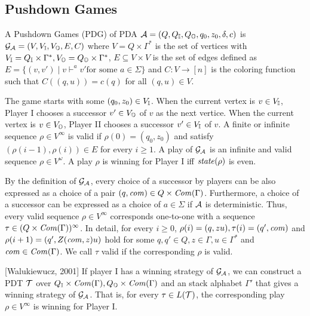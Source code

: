 \subsection{Pushdown Games}

\begin{definition}
A {Pushdown Games} (PDG) of PDA ${\cal A} = (Q, Q_{\mathbb{I}}, Q_{\mathbb{O}}, q_0, z_0, \delta, c)$ is ${\cal G}_{\cal A} = (V, V_{\mathbb{I}}, V_{\mathbb{O}}, E, C)$ where
$V = Q\times\Gamma^*$ is the set of vertices with $V_{\mathbb{I}} = Q_{\mathbb{I}}\times\Gamma^*, V_{\mathbb{O}} = Q_{\mathbb{O}}\times\Gamma^*$, $E\subseteq V\times V$ is the set of edges defined as $E = \{(v,v') \mid v \vdash^a v' \text{for some $a\in \Sigma$}\}$
and $C: V \to [n]$ is the coloring function such that
$C((q,u)) = c(q)$ for all $(q,u)\in V$.
\end{definition}

The game starts with some $(q_0,z_0)\in V_{\mathbb{I}}$.
When the current vertex is $v\in V_{\mathbb{I}}$,
Player I chooses a successor $v'\in V_{\mathbb{O}}$ of $v$ as the next vertice.
When the current vertex is $v\in V_{\mathbb{O}}$,
Player II chooses a successor $v'\in V_{\mathbb{I}}$ of $v$.
A finite or infinite sequence $\rho\in V^\infty$ is valid if
$\rho(0)=(q_0,z_0)$ and satisfy
$(\rho(i-1), \rho(i))\in E$ for every $i\geq 1$.
A play of ${\cal G}_{\cal A}$ is an infinite and valid sequence $\rho\in V^\omega$.
A play $\rho$ is winning for Player I iff $\mathit{state}(\rho)$ is even.

By the definition of ${\cal G}_{\cal A}$,
every choice of a successor by players can be also expressed as
a choice of a pair $(q,\mathit{com})\in Q\times \mathit{Com}(\Gamma)$. Furthermore, a choice of a successor can be expressed as a choice of $a\in\Sigma$ if ${\cal A}$ is deterministic.
Thus, every valid sequence $\rho \in V^\infty$
corresponds one-to-one with a sequence $\tau\in (Q\times \mathit{Com}(\Gamma))^\infty$.
In detail, for every $i\geq 0$, $\rho(i) = (q, zu), \tau(i) = (q', \mathit{com})$ and $\rho(i+1) = (q', Z(\mathit{com},z)u)$ hold for some $q, q'\in Q, z\in\Gamma, u\in\Gamma^*$ and $\mathit{com}\in \mathit{Com}(\Gamma)$.
We call $\tau$ valid if the corresponding $\rho$ is valid.

\begin{theorem}{[Walukiewucz, 2001]}
\label{the: wal}
If player I has a winning strategy of ${\cal G}_{\cal A}$,
we can construct a PDT ${\cal T}$ over $Q_{\mathbb{I}}\times\mathit{Com}(\Gamma), Q_{\mathbb{O}}\times\mathit{Com}(\Gamma)$ and an stack alphabet $\Gamma'$ that gives a winning strategy of ${\cal G}_{\cal A}$.
That is, for every $\tau\in L({\cal T})$, the corresponding play $\rho\in V^\infty$ is winning for Player I.
\end{theorem}

